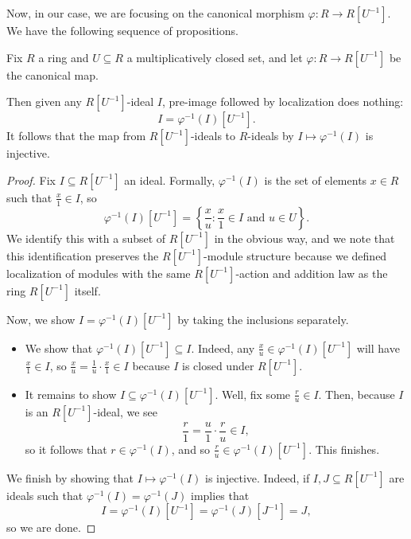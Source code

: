 \documentclass[../notes.tex]{subfiles}
\begin{document}
Now, in our case, we are focusing on the canonical morphism $\varphi:R\to R\left[U^{-1}\right]$. We have the following sequence of propositions.
\begin{lemma} \label{lem:localidealsa}
	Fix $R$ a ring and $U\subseteq R$ a multiplicatively closed set, and let $\varphi:R\to R\left[U^{-1}\right]$ be the canonical map.
	
	Then given any $R\left[U^{-1}\right]$-ideal $I$, pre-image followed by localization does nothing:
	\[I=\varphi^{-1}(I)\left[U^{-1}\right].\]
	It follows that the map from $R\left[U^{-1}\right]$-ideals to $R$-ideals by $I\mapsto\varphi^{-1}(I)$ is injective.
\end{lemma}
\begin{proof}
	Fix $I\subseteq R\left[U^{-1}\right]$ an ideal. Formally, $\varphi^{-1}(I)$ is the set of elements $x\in R$ such that $\frac x1\in I$, so
	\[\varphi^{-1}(I)\left[U^{-1}\right]=\left\{\frac xu:\frac x1\in I\text{ and }u\in U\right\}.\]
	We identify this with a subset of $R\left[U^{-1}\right]$ in the obvious way, and we note that this identification preserves the $R\left[U^{-1}\right]$-module structure because we defined localization of modules with the same $R\left[U^{-1}\right]$-action and addition law as the ring $R\left[U^{-1}\right]$ itself.

	Now, we show $I=\varphi^{-1}(I)\left[U^{-1}\right]$ by taking the inclusions separately.
	\begin{itemize}
		\item We show that $\varphi^{-1}(I)\left[U^{-1}\right]\subseteq I$. Indeed, any $\frac xu\in\varphi^{-1}(I)\left[U^{-1}\right]$ will have $\frac x1\in I$, so $\frac xu=\frac1u\cdot\frac x1\in I$ because $I$ is closed under $R\left[U^{-1}\right]$.
		\item It remains to show $I\subseteq\varphi^{-1}(I)\left[U^{-1}\right]$. Well, fix some $\frac ru\in I$. Then, because $I$ is an $R\left[U^{-1}\right]$-ideal, we see
		\[\frac r1=\frac u1\cdot\frac ru\in I,\]
		so it follows that $r\in\varphi^{-1}(I)$, and so $\frac ru\in\varphi^{-1}(I)\left[U^{-1}\right]$. This finishes.
	\end{itemize}
	We finish by showing that $I\mapsto\varphi^{-1}(I)$ is injective. Indeed, if $I,J\subseteq R\left[U^{-1}\right]$ are ideals such that $\varphi^{-1}(I)=\varphi^{-1}(J)$ implies that
	\[I=\varphi^{-1}(I)\left[U^{-1}\right]=\varphi^{-1}(J)\left[J^{-1}\right]=J,\]
	so we are done.
\end{proof}
\end{document}
